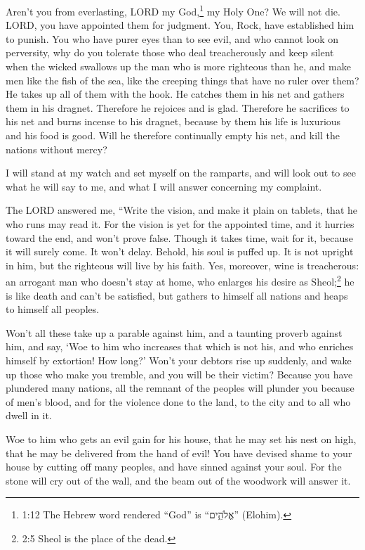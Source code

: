 \myverse{}Aren’t you from everlasting, LORD my God,\footnote{1:12 The Hebrew word rendered “God” is “אֱלֹהִ֑ים” (Elohim).} my Holy One? We will not die. LORD, you have appointed them for judgment. You, Rock, have established him to punish. \myverse{}You who have purer eyes than to see evil, and who cannot look on perversity, why do you tolerate those who deal treacherously and keep silent when the wicked swallows up the man who is more righteous than he, \myverse{}and make men like the fish of the sea, like the creeping things that have no ruler over them? \myverse{}He takes up all of them with the hook. He catches them in his net and gathers them in his dragnet. Therefore he rejoices and is glad. \myverse{}Therefore he sacrifices to his net and burns incense to his dragnet, because by them his life is luxurious and his food is good. \myverse{}Will he therefore continually empty his net, and kill the nations without mercy?


\mychapter{} \myverse*{}I will stand at my watch and set myself on the ramparts, and will look out to see what he will say to me, and what I will answer concerning my complaint.


\myverse{}The LORD answered me, “Write the vision, and make it plain on tablets,
that he who runs may read it. \myverse{}For the vision is yet for the appointed time, and it hurries toward the end, and won’t prove false. Though it takes time, wait for it, because it will surely come. It won’t delay. \myverse{}Behold, his soul is puffed up. It is not upright in him, but the righteous will live by his faith. \myverse{}Yes, moreover, wine is treacherous: an arrogant man who doesn’t stay at home, who enlarges his desire as Sheol;\footnote{2:5 Sheol is the place of the dead.} he is like death and can’t be satisfied, but gathers to himself all nations and heaps to himself all peoples.


\myverse{}Won’t all these take up a parable against him, and a taunting proverb against him, and say, ‘Woe to him who increases that which is not his, and who enriches himself by extortion! How long?’ \myverse{}Won’t your debtors rise up suddenly, and wake up those who make you tremble, and you will be their victim? \myverse{}Because you have plundered many nations, all the remnant of the peoples will plunder you because of men’s blood, and for the violence done to the land, to the city and to all who dwell in it.


\myverse{}Woe to him who gets an evil gain for his house, that he may set his nest on high, that he may be delivered from the hand of evil! \myverse{}You have devised shame to your house by cutting off many peoples, and have sinned against your soul. \myverse{}For the stone will cry out of the wall, and the beam out of the woodwork will answer it.


